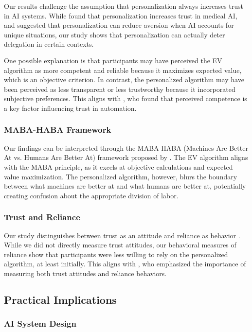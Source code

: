 Our results challenge the assumption that personalization always increases trust in AI systems. While \citet{longoni2019} found that personalization increases trust in medical AI, and \citet{jussupow2020} suggested that personalization can reduce aversion when AI accounts for unique situations, our study shows that personalization can actually deter delegation in certain contexts.

One possible explanation is that participants may have perceived the EV algorithm as more competent and reliable because it maximizes expected value, which is an objective criterion. In contrast, the personalized algorithm may have been perceived as less transparent or less trustworthy because it incorporated subjective preferences. This aligns with \citet{hoff2015}, who found that perceived competence is a key factor influencing trust in automation.

\subsubsection{MABA-HABA Framework}

Our findings can be interpreted through the MABA-HABA (Machines Are Better At vs. Humans Are Better At) framework proposed by \citet{glikson2020}. The EV algorithm aligns with the MABA principle, as it excels at objective calculations and expected value maximization. The personalized algorithm, however, blurs the boundary between what machines are better at and what humans are better at, potentially creating confusion about the appropriate division of labor.

\subsubsection{Trust and Reliance}

Our study distinguishes between trust as an attitude and reliance as behavior \citep{lee2004}. While we did not directly measure trust attitudes, our behavioral measures of reliance show that participants were less willing to rely on the personalized algorithm, at least initially. This aligns with \citet{kohn2021}, who emphasized the importance of measuring both trust attitudes and reliance behaviors.

\subsection{Practical Implications}

\subsubsection{AI System Design}

